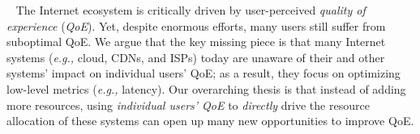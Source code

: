\documentclass{proposalnsf}
\newcommand{\eg}{{\it e.g.,}\xspace}
\newcommand{\mypara}[1]{\smallskip\noindent{\bf {#1}:}~}
\begin{document}



\vspace{-0.2cm}

\mypara{Summary}
The Internet ecosystem is critically driven by user-perceived {\em quality of experience} ({\em QoE}). 
Yet, despite enormous efforts, many users still suffer from suboptimal QoE.
We argue that the key missing piece is that many Internet systems (\eg cloud, CDNs, and ISPs) today are unaware of their and other systems' impact on individual users' QoE; as a result, they focus on optimizing low-level metrics (\eg latency).
Our overarching thesis is that instead of adding more resources, using {\em individual users' QoE} to {\em directly} drive the resource allocation of these systems can open up many new opportunities to improve QoE.
\end{document}
